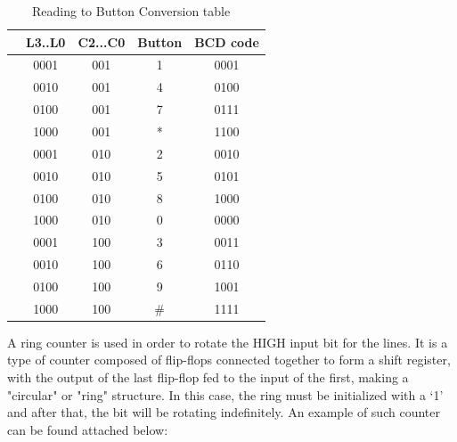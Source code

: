\begin{table}[H]
    \centering
        \begin{tabular}[t]{lcccc}
            \toprule
            &\textbf{L3..L0}&\textbf{C2...C0}&\textbf{Button}&\textbf{BCD code}\\
            \midrule
                &    0001   & 001     & 1      & 0001     \\
                &    0010   & 001     & 4      & 0100     \\
                &    0100   & 001     & 7      & 0111     \\
                &    1000   & 001     & *      & 1100     \\
                &    0001   & 010     & 2      & 0010     \\
                &    0010   & 010     & 5      & 0101     \\
                &    0100   & 010     & 8      & 1000     \\
                &    1000   & 010     & 0      & 0000     \\
                &    0001   & 100     & 3      & 0011     \\
                &    0010   & 100     & 6      & 0110     \\
                &    0100   & 100     & 9      & 1001     \\
                &    1000   & 100     & \#     & 1111     \\
            \bottomrule
        \end{tabular}
        \caption{Reading to Button Conversion table ~\autocite{SLIDES_5}}
        \label{table: KEYPAD_TABLE}
\end{table}


A ring counter is used in order to rotate the HIGH input bit for the lines. It is a type of counter composed of flip-flops connected together to form a shift register, with the output of the last flip-flop fed to the input of the first, making a "circular" or "ring" structure. In this case, the ring must be initialized with a ‘1’ and after that, the bit will be rotating indefinitely. An example of such counter can be found attached below:

